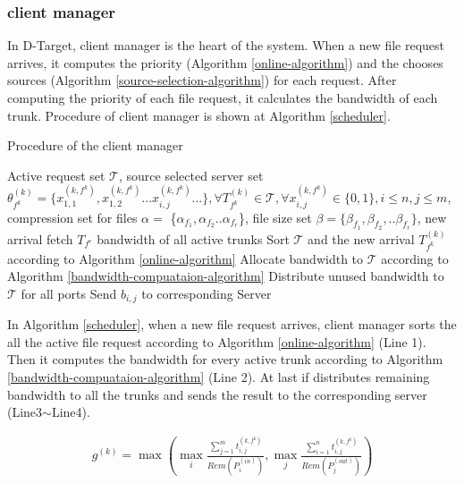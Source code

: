 \documentclass{IEEEtran}
\begin{document}
\subsubsection{client manager}
In D-Target, client manager is the heart of the system. 
When a new file request arrives,
it computes the priority (Algorithm \ref{online-algorithm}) and the chooses sources (Algorithm \ref{source-selection-algorithm}) for each request.
After computing the priority of each file request, it calculates the bandwidth of each trunk. 
Procedure of client manager is shown at Algorithm \ref{scheduler}.

\begin{algorithm} \label{procedure_client_manager}
\caption{Procedure of the client manager}
\begin{algorithmic}[1]\label{scheduler}
\renewcommand{\algorithmicrequire}{\textbf{Input: }}
\renewcommand{\algorithmicensure}{\textbf{Output:}}
\REQUIRE Active request set $\mathcal{T}$, source selected server set $\theta_{f^k}^{(k)}=\{x_{1,1} ^{(k,f^k)},x_{1,2} ^{(k,f^k)}...x_{i,j}^{(k,f^k)}...\} ,\forall T^{(k)}_{f^k} \in \mathcal{T},\forall x_{i,j}^{(k,f^k)} \in \{0,1\},i \le n,j \le m$,  compression set for files $\alpha=$ \{$\alpha_{f_1},\alpha_{f_2}..\alpha_{f_r}$\}, file size set $\beta=\{\beta_{f_1},\beta_{f_2},..\beta_{f_r}\}$, new arrival fetch  $T_{f^c}$
\ENSURE  bandwidth of all active trunks 
\STATE Sort $\mathcal{T}$ and the new arrival  $T^{(k)}_{f^k}$ according to Algorithm \ref{online-algorithm}
\STATE Allocate bandwidth to $\mathcal{T}$ according to Algorithm \ref{bandwidth-compuataion-algorithm}
\STATE Distribute unused bandwidth to $\mathcal{T}$ for all ports
\STATE Send $b_{i,j}$ to corresponding Server
\end{algorithmic} 
\end{algorithm}

In Algorithm \ref{scheduler}, when a new file request arrives, 
client manager sorts the all the active file request according to Algorithm \ref{online-algorithm} (Line 1).
Then it computes the bandwidth for every active trunk according to Algorithm \ref{bandwidth-compuataion-algorithm} (Line 2).
At last if distributes remaining bandwidth to all the trunks and sends the result to the corresponding server (Line3$
\sim$Line4).


\begin{eqnarray} \label{weight_completion_gamma}
g^{(k)}=\max(\max \limits_i \frac{ \sum_{j=1}^mt_{i,j}^{(k,f^k)}}{Rem(P_i^{(in)})},\max \limits_j \frac{ \sum_{i=1}^nt_{i,j}^{(k,f^k)}}{Rem(P_j^{(out)})})
\end{eqnarray}
\end{document}
